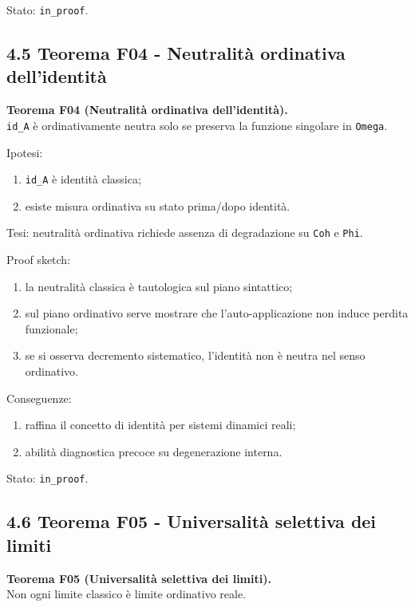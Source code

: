 Stato: \texttt{in\_proof}.

\subsection{4.5 Teorema F04 - Neutralità ordinativa dell'identità}

\textbf{Teorema F04 (Neutralità ordinativa dell'identità).}\\
\texttt{id\_A} è ordinativamente neutra solo se preserva la funzione singolare in \texttt{Omega}.

Ipotesi:

\begin{enumerate}
\def\labelenumi{\arabic{enumi}.}
\tightlist
\item
  \texttt{id\_A} è identità classica;
\item
  esiste misura ordinativa su stato prima/dopo identità.
\end{enumerate}

Tesi:
neutralità ordinativa richiede assenza di degradazione su \texttt{Coh} e \texttt{Phi}.

Proof sketch:

\begin{enumerate}
\def\labelenumi{\arabic{enumi}.}
\tightlist
\item
  la neutralità classica è tautologica sul piano sintattico;
\item
  sul piano ordinativo serve mostrare che l'auto-applicazione non induce perdita funzionale;
\item
  se si osserva decremento sistematico, l'identità non è neutra nel senso ordinativo.
\end{enumerate}

Conseguenze:

\begin{enumerate}
\def\labelenumi{\arabic{enumi}.}
\tightlist
\item
  raffina il concetto di identità per sistemi dinamici reali;
\item
  abilità diagnostica precoce su degenerazione interna.
\end{enumerate}

Stato: \texttt{in\_proof}.

\subsection{4.6 Teorema F05 - Universalità selettiva dei limiti}

\textbf{Teorema F05 (Universalità selettiva dei limiti).}\\
Non ogni limite classico è limite ordinativo reale.

